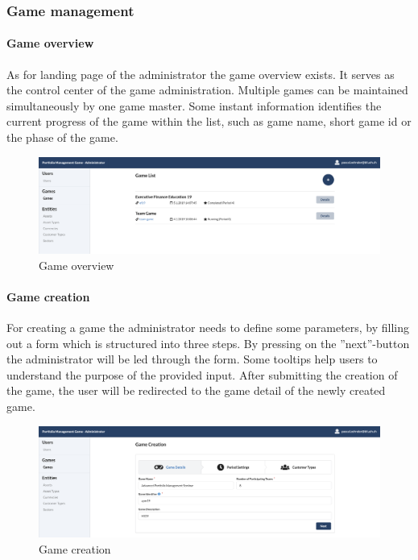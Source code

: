 \subsubsection{Game management}
\paragraph{Game overview}
\label{paragraph:game_overview}
As for landing page of the administrator the game overview exists. It serves as the control center of the game administration. Multiple games can be maintained simultaneously by one game master. Some instant information identifies the current progress of the game within the list, such as game name, short game id or the phase of the game.
\begin{figure}[h!]
  \centering
  \includegraphics[scale=0.2]{img/application-overview/administrator/02_game_overview.png}
  \caption{Game overview}
  \label{fig:game_overview}
\end{figure}

\paragraph{Game creation}
For creating a game the administrator needs to define some parameters, by filling out a form which is structured into three steps. By pressing on the ''next''-button the administrator will be led through the form. Some tooltips help users to understand the purpose of the provided input. After submitting the creation of the game, the user will be redirected to the game detail of the newly created game.
\begin{figure}[h!]
  \centering
  \includegraphics[scale=0.2]{img/application-overview/administrator/03_game_creation.png}
  \caption{Game creation}
\end{figure}


